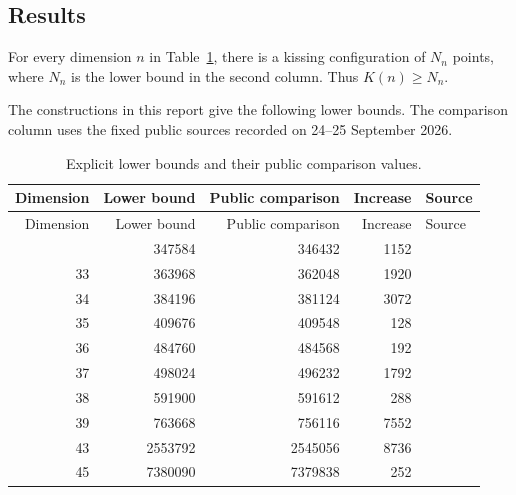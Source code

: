 \subsection{Results}

\begin{theorem}\label{thm:main}
For every dimension $n$ in Table~\ref{tab:results}, there is a kissing configuration of $N_n$ points, where $N_n$ is the lower bound in the second column. Thus $K(n)\ge N_n$.
\end{theorem}

The constructions in this report give the following lower bounds. The comparison column uses the fixed public sources recorded on 24–25 September 2026.

\begin{longtable}{rrrrl}
\caption{Explicit lower bounds and their public comparison values.}\label{tab:results}\\
\toprule
Dimension & Lower bound & Public comparison & Increase & Source\\\midrule
\endfirsthead
\toprule
Dimension & Lower bound & Public comparison & Increase & Source\\\midrule
\endhead
\bottomrule\endfoot
32 & 347584 & 346432 & 1152 & \cite{brouwer} \\
33 & 363968 & 362048 & 1920 & \cite{brouwer} \\
34 & 384196 & 381124 & 3072 & \cite{brouwer} \\
35 & 409676 & 409548 & 128 & \cite{brouwer} \\
36 & 484760 & 484568 & 192 & \cite{brouwer} \\
37 & 498024 & 496232 & 1792 & \cite{brouwer} \\
38 & 591900 & 591612 & 288 & \cite{kissingnumbers} \\
39 & 763668 & 756116 & 7552 & \cite{kissingnumbers} \\
43 & 2553792 & 2545056 & 8736 & \cite{sunwang-sections,crosssections} \\
45 & 7380090 & 7379838 & 252 & \cite{sunwang-sections,crosssections} \\
\end{longtable}
